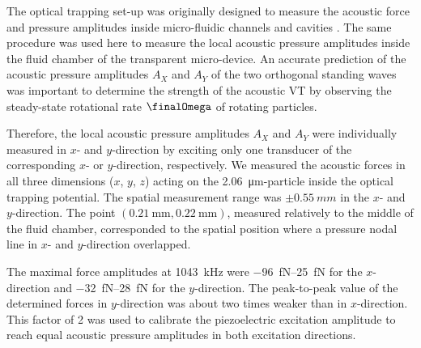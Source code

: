 The optical trapping set-up was originally designed to measure the acoustic 
force and pressure amplitudes inside micro-fluidic channels and cavities 
\cite{Lakamper,Lamprecht2016}. The same procedure was used here to measure the 
local acoustic pressure amplitudes inside the fluid chamber of the transparent 
micro-device. An accurate prediction of the acoustic pressure amplitudes $A_{X}$ 
and $A_{Y}$ of the two orthogonal standing waves was important to determine the 
strength of the acoustic VT by observing the steady-state rotational rate 
$\finalOmega$ of rotating particles.

Therefore, the local acoustic pressure amplitudes $A_{X}$ and $A_{Y}$ were 
individually measured in $x$- and $y$-direction by exciting only one transducer 
of the corresponding $x$- or $y$-direction, respectively. We measured the 
acoustic forces in all three dimensions ($x$, $y$, $z$) acting on the 
\SI{2.06}{\micro\meter}-particle inside the optical trapping potential. The 
spatial measurement range was $\pm \SI{0.55}{mm}$ in the $x$- and $y$-direction.  
The point $(\SI{0.21}{\mm}, \SI{0.22}{\mm})$, measured relatively to the middle 
of the fluid chamber, corresponded to the spatial position where a pressure 
nodal line in $x$- and $y$-direction overlapped.

The maximal force amplitudes at \SI{1043}{\kilo\hertz} were 
\SIrange{-96}{+25}{\femto\newton} for the $x$-direction and 
\SIrange{-32}{28}{\femto\newton} for the $y$-direction. The peak-to-peak value 
of the determined forces in $y$-direction was about two times weaker than in 
$x$-direction. This factor of 2 was used to calibrate the piezoelectric 
excitation amplitude to reach equal acoustic pressure amplitudes in both 
excitation directions.

